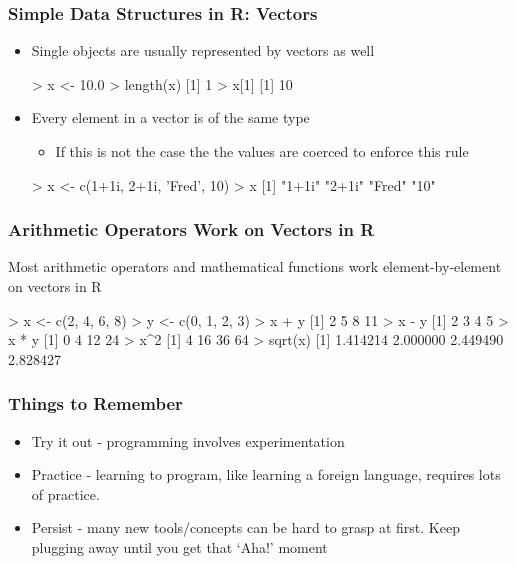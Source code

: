 \documentclass{beamer}
\begin{document}
\begin{frame}[fragile]
  \frametitle{Simple Data Structures in R: Vectors}

\begin{itemize}

\item Single objects are usually represented by vectors as well
\begin{Rcode}
> x <- 10.0
> length(x)
[1] 1
> x[1]
[1] 10
\end{Rcode}


\item Every element in a vector is of the same type

\begin{itemize}
	\item If this is not the case the the values are coerced to enforce this rule
\end{itemize}

\begin{Rcode}
> x <- c(1+1i, 2+1i, 'Fred', 10)
> x
[1] "1+1i" "2+1i" "Fred" "10"
\end{Rcode}

\end{itemize}

\end{frame}


\begin{frame}[fragile]
  \frametitle{Arithmetic Operators Work on Vectors in R}

Most arithmetic operators and mathematical functions work element-by-element on vectors in R

\begin{Rcode}
> x <- c(2, 4, 6, 8)
> y <- c(0, 1, 2, 3)
> x + y
[1]  2  5  8 11
> x - y
[1] 2 3 4 5
> x * y
[1]  0  4 12 24
> x^2
[1]  4 16 36 64
> sqrt(x)
[1] 1.414214 2.000000 2.449490 2.828427
\end{Rcode}

\end{frame}



\begin{frame}
  \frametitle{Things to Remember}

\begin{itemize}

 \item Try it out - programming involves experimentation
 \item Practice - learning to program, like learning a foreign language, requires lots of practice.
 \item Persist - many new tools/concepts can be hard to grasp at first. Keep plugging away until you get that `Aha!' moment
\end{itemize}


\end{frame}
\end{document}
